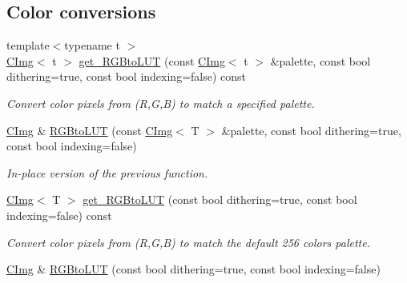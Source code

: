 \subsection*{Color conversions}
\begin{DoxyCompactItemize}
\item 
{\footnotesize template$<$typename t $>$ }\\\hyperlink{structcimg__library_1_1_c_img}{C\-Img}$<$ t $>$ \hyperlink{structcimg__library_1_1_c_img_ab2d6463804faab6dd4def4be68220d3b}{get\-\_\-\-R\-G\-Bto\-L\-U\-T} (const \hyperlink{structcimg__library_1_1_c_img}{C\-Img}$<$ t $>$ \&palette, const bool dithering=true, const bool indexing=false) const 
\begin{DoxyCompactList}\small\item\em Convert color pixels from (R,G,B) to match a specified palette. \end{DoxyCompactList}\item 
\hypertarget{structcimg__library_1_1_c_img_abcf750a4bb72227df700b69ca7272c1e}{\hyperlink{structcimg__library_1_1_c_img}{C\-Img} \& \hyperlink{structcimg__library_1_1_c_img_abcf750a4bb72227df700b69ca7272c1e}{R\-G\-Bto\-L\-U\-T} (const \hyperlink{structcimg__library_1_1_c_img}{C\-Img}$<$ T $>$ \&palette, const bool dithering=true, const bool indexing=false)}\label{structcimg__library_1_1_c_img_abcf750a4bb72227df700b69ca7272c1e}

\begin{DoxyCompactList}\small\item\em In-\/place version of the previous function. \end{DoxyCompactList}\item 
\hyperlink{structcimg__library_1_1_c_img}{C\-Img}$<$ T $>$ \hyperlink{structcimg__library_1_1_c_img_a21e9195be99dcd4db84faf8e7b8f52f4}{get\-\_\-\-R\-G\-Bto\-L\-U\-T} (const bool dithering=true, const bool indexing=false) const 
\begin{DoxyCompactList}\small\item\em Convert color pixels from (R,G,B) to match the default 256 colors palette. \end{DoxyCompactList}\item 
\hypertarget{structcimg__library_1_1_c_img_ad63792a32667c1588c6e74dd85c698cf}{\hyperlink{structcimg__library_1_1_c_img}{C\-Img} \& \hyperlink{structcimg__library_1_1_c_img_ad63792a32667c1588c6e74dd85c698cf}{R\-G\-Bto\-L\-U\-T} (const bool dithering=true, const bool indexing=false)}\label{structcimg__library_1_1_c_img_ad63792a32667c1588c6e74dd85c698cf}


\end{DoxyCompactItemize}
